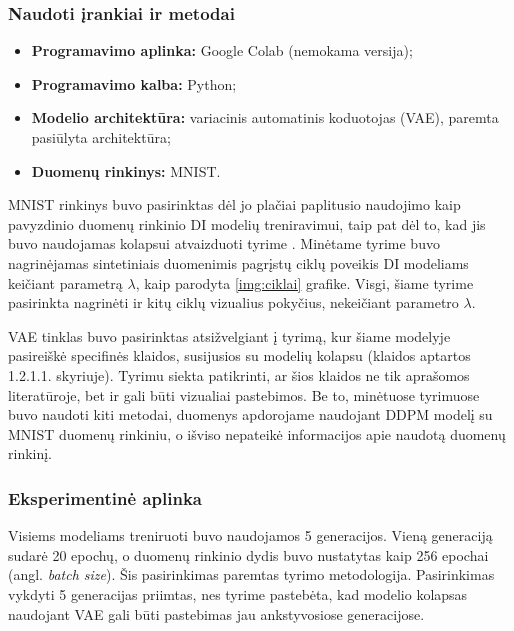 \documentclass{VUMIFInfKursinis}
\begin{document}
\subsubsection{Naudoti įrankiai ir metodai}

\begin{itemize}
    \item \textbf{Programavimo aplinka:} Google Colab (nemokama versija);
    \item \textbf{Programavimo kalba:} Python;
    \item \textbf{Modelio architektūra:} variacinis automatinis koduotojas (VAE), paremta \cite{bla_bla} pasiūlyta architektūra;
    \item \textbf{Duomenų rinkinys:} MNIST.
\end{itemize}


MNIST rinkinys buvo pasirinktas dėl jo plačiai paplitusio naudojimo kaip pavyzdinio duomenų rinkinio DI modelių treniravimui, taip pat dėl to, kad jis buvo naudojamas kolapsui atvaizduoti tyrime \cite{ModelsGoMAD}. Minėtame tyrime buvo nagrinėjamas sintetiniais duomenimis pagrįstų ciklų poveikis DI modeliams keičiant parametrą \(\lambda\), kaip parodyta \ref{img:ciklai} grafike. Visgi, šiame tyrime pasirinkta nagrinėti ir kitų ciklų vizualius pokyčius, nekeičiant parametro \(\lambda\). 

VAE tinklas buvo pasirinktas atsižvelgiant į \cite{AICollapseNature} tyrimą, kur šiame modelyje pasireiškė specifinės klaidos, susijusios su modelių kolapsu (klaidos aptartos 1.2.1.1. skyriuje). Tyrimu siekta patikrinti, ar šios klaidos ne tik aprašomos literatūroje, bet ir gali būti vizualiai pastebimos. Be to, minėtuose tyrimuose buvo naudoti kiti metodai, \cite{DesniuPasiulymai} duomenys apdorojame naudojant DDPM modelį su MNIST duomenų rinkiniu, o \cite{AICollapseNature} išviso nepateikė informacijos apie naudotą duomenų rinkinį.

\subsubsection{Eksperimentinė aplinka}

Visiems modeliams treniruoti buvo naudojamos 5 generacijos. Vieną generaciją sudarė 20 epochų, o duomenų rinkinio dydis buvo nustatytas kaip 256 epochai (angl. \textsl{batch size}). Šis pasirinkimas paremtas \cite{ModelsGoMAD} tyrimo metodologija. Pasirinkimas vykdyti 5 generacijas priimtas, nes tyrime \cite{AICollapseNature} pastebėta, kad modelio kolapsas naudojant VAE gali būti pastebimas jau ankstyvosiose generacijose.
\end{document}
